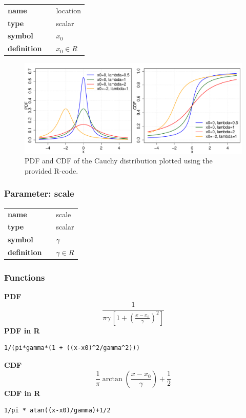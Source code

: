 \noindent\begin{tabular}{p{2cm}cl}
\textbf{name} & & location \\
\textbf{type} & & scalar \\
\textbf{symbol} & & $x_0$  \\
\textbf{definition} & & $x_0 \in  R$
\end{tabular}

\begin{figure}[htb!]
\centering
  \includegraphics[width=140mm]{pics/Cauchy_pdf_cdf.pdf}
 \caption{PDF and CDF of the Cauchy distribution plotted using the provided R-code.}
 \label{fig:Cauchy_pdf_cdf}
\end{figure}

\subsubsection*{Parameter: scale}

\noindent\begin{tabular}{p{2cm}cl}
\textbf{name} & & scale \\
\textbf{type} & & scalar \\
\textbf{symbol} & & $\gamma$  \\
\textbf{definition} & & $\gamma \in  R$
\end{tabular}
\subsubsection*{Functions}

\smallskip \noindent \hspace{.2cm} \textbf{PDF} 
\begin{equation*}\frac{1}{\pi\gamma\,\left[1 + \left(\frac{x-x_0}{\gamma}\right)^2\right]}\end{equation*}
\smallskip \noindent \hspace{.2cm} \textbf{PDF in R}  
\begin{verbatim}
1/(pi*gamma*(1 + ((x-x0)^2/gamma^2)))
\end{verbatim}
\smallskip \noindent \hspace{.2cm} \textbf{CDF} 
\begin{equation*}
\frac{1}{\pi} \arctan\left(\frac{x-x_0}{\gamma}\right)+\frac{1}{2}
\end{equation*}
\smallskip \noindent \hspace{.2cm} \textbf{CDF in R}  
\begin{verbatim}
1/pi * atan((x-x0)/gamma)+1/2
\end{verbatim}


